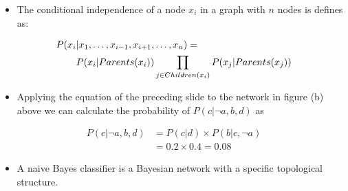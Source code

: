 \documentclass[xcolor={table}]{beamer}
\begin{document}
 \begin{frame} 
 \begin{itemize}
 	\item The conditional independence of a node $x_i$ in a graph with $n$ nodes is defines as:
\end{itemize}
\begin{alignat}{2}
P(x_i&| x_1, \dots, x_{i-1}, x_{i+1}, \dots, x_n) = \notag\\
 &P(x_i|Parents(x_i)) \prod_{j \in Children(x_i)} P(x_j|Parents(x_j))
\label{eq:bnconditional}
\end{alignat}
\end{frame} 



 \begin{frame} 
 \begin{itemize}
 	\item Applying the equation of the preceding slide to the network in figure (b) above we can calculate the probability of $P(c|\lnot a, b , d)$ as
\end{itemize}

\begin{align*}
P(c|\lnot a, b , d) &= P(c|d) \times P(b|c,\lnot a)\\
&= 0.2 \times 0.4 = 0.08
\end{align*}
\end{frame} 

\begin{frame}
 \begin{itemize}
 	\item A naive Bayes classifier is a Bayesian network with a specific topological structure.
\end{itemize}
\end{frame}
\end{document}
